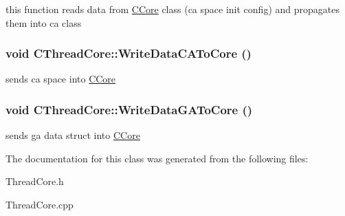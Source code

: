\label{classCThreadCore_af979f38a80787229941f03512e003c09}
this function reads data from \hyperlink{classCCore}{CCore} class (ca space init config) and propagates them into ca class \hypertarget{classCThreadCore_a427dd34ccf958e15f9b9754ca4b21088}{
\subsubsection[{WriteDataCAToCore}]{\setlength{\rightskip}{0pt plus 5cm}void CThreadCore::WriteDataCAToCore ()}}
\label{classCThreadCore_a427dd34ccf958e15f9b9754ca4b21088}
sends ca space into \hyperlink{classCCore}{CCore} \hypertarget{classCThreadCore_a533ca5b498cbe0395dedd01e1646c973}{
\subsubsection[{WriteDataGAToCore}]{\setlength{\rightskip}{0pt plus 5cm}void CThreadCore::WriteDataGAToCore ()}}
\label{classCThreadCore_a533ca5b498cbe0395dedd01e1646c973}
sends ga data struct into \hyperlink{classCCore}{CCore} 

The documentation for this class was generated from the following files:\begin{DoxyCompactItemize}
\item 
ThreadCore.h\item 
ThreadCore.cpp\end{DoxyCompactItemize}
